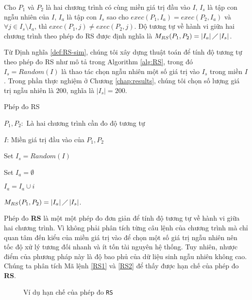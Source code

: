\begin{definition}[Phép đo RS]
  \label{def:RS-sim}
  Cho $P_{1}$ và $P_{2}$ là hai chương trình có cùng miền giá trị đầu
  vào $I$, $I_{s}$ là tập con ngẫu nhiên của $I$, $I_{a}$ là tập con
  $I_{s}$ sao cho $exec(P_{1}, I_a) = exec(P_{2}, I_a)$ và
  $\forall j \in I_{s} \setminus I_{a}$, thì
  $exec(P_{1}, j) \neq exec(P_{2}, j)$. Độ tương tự về hành vi giữa
  hai chương trình theo phép đo RS được định nghĩa là
  $M_{RS}(P_{1}, P_{2}) = \left|I_{a}\right| \diagup
  \left|I_{s}\right| $.
\end{definition}

Từ Định nghĩa \ref{def:RS-sim}, chúng tôi xây dựng thuật toán để tính
độ tương tự theo phép đo RS như mô tả trong Algorithm \ref{alg:RS},
trong đó $I_s = Random(I)$ là thao tác chọn ngẫu nhiên một số giá trị
vào $I_s$ trong miền $I$. Trong phần thực nghiệm ở Chương
\ref{chap:results}, chúng tôi chọn số lượng giá trị ngẫu nhiên là
$200$, nghĩa là $|I_s| = 200$.

\begin{algorithm}[H]
  \caption{Phép đo RS}
  \label{alg:RS}
  \begin{algorithmic}
  \item $P_{1}, P_{2}:$ Là hai chương trình cần đo độ tương tự
  \item $I$: Miền giá trị đầu vào của $P_{1}, P_{2}$
  \item Set $I_{s} = Random(I)$ 
  \item Set $I_{a} = \emptyset$

         \State
        $I_{a} = I_{a} \cup i$
    \EndIf
    \EndFor
  \item
    $M_{RS}(P_{1}, P_{2}) = \left|I_{a}\right| \diagup
    \left|I_{s}\right| $.
  \end{algorithmic}
\end{algorithm}


Phép đo \textbf{RS} là một một phép đo đơn giản để tính độ tương tự về hành vi giữa hai chương trình. Vì không phải phân tích từng câu lệnh của chương trình mà chỉ quan tâm đến kiểu của miền giá trị vào để chọn một số giá trị ngẫu nhiên nên tốc độ xử lý tương đối nhanh và ít tốn tài nguyên hệ thống. Tuy nhiên, nhược điểm của phương pháp này là độ bao phủ của dữ liệu sinh ngẫu nhiên không cao. Chúng ta phân tích Mã lệnh \ref{RS1} và \ref{RS2} để thấy được hạn chế của phép đo \textbf{RS}.

\begin{figure}[h]
	\centering
	\caption{Ví dụ hạn chế của phép đo \texttt{RS}}
	\label{fig:Hanche-RS}
	\begin{minipage}[t]{0.45\linewidth}
		
	\end{minipage}%
	\hfill\vrule\hfill
	\begin{minipage}[t]{0.45\linewidth}
		
	\end{minipage}%
\end{figure}


